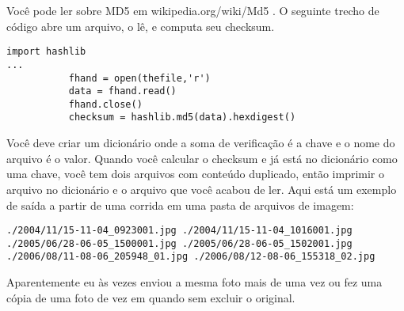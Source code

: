 Você pode ler sobre MD5 em wikipedia.org/wiki/Md5 . O
seguinte trecho de código abre um arquivo, o lê, e computa
seu checksum.

\begin{verbatim}
import hashlib 
...
           fhand = open(thefile,'r')
           data = fhand.read()
           fhand.close()
           checksum = hashlib.md5(data).hexdigest()
\end{verbatim}
%

Você deve criar um dicionário onde a soma de verificação é a chave
e o nome do arquivo é o valor. Quando você calcular o checksum
e já está no dicionário como uma chave, você tem dois arquivos com
conteúdo duplicado, então imprimir o arquivo no dicionário
e o arquivo que você acabou de ler. Aqui está um exemplo de saída
a partir de uma corrida em uma pasta de arquivos de imagem:

\begin{verbatim}
./2004/11/15-11-04_0923001.jpg ./2004/11/15-11-04_1016001.jpg
./2005/06/28-06-05_1500001.jpg ./2005/06/28-06-05_1502001.jpg
./2006/08/11-08-06_205948_01.jpg ./2006/08/12-08-06_155318_02.jpg
\end{verbatim}
%
Aparentemente eu às vezes enviou a mesma foto mais de uma vez
ou fez uma cópia de uma foto de vez em quando sem excluir
o original.

